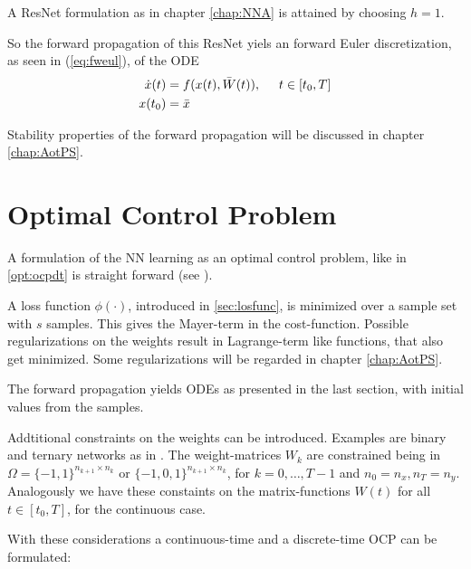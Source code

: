 \documentclass[a4paper, 12pt]{scrreprt} %
\begin{document}
A ResNet formulation as in chapter \ref{chap:NNA} is attained by choosing $h=1$.

So the forward propagation of this ResNet yiels an forward Euler discretization, as seen in (\ref{eq:fweul}), of the \ac{ODE}
\begin{align*}
\dot x(t) &= f(x(t),\bar{W}(t)) , \hspace{0.5cm}t\in [t_0,T] \\
x(t_0) &= \bar{x} 
\end{align*}

Stability properties of the forward propagation will be discussed in chapter \ref{chap:AotPS}.

\section{Optimal Control Problem}

A formulation of the \ac{NN} learning as an optimal control problem, like in \ref{opt:ocpdt} is straight forward (see \cite{aocatdl}). \newline

A loss function $\phi(\cdot)$, introduced in \ref{sec:losfunc}, is minimized over a sample set with $s$ samples. This gives the Mayer-term in the cost-function. Possible regularizations on the weights result in Lagrange-term like functions, that also get minimized. Some regularizations will be regarded in chapter \ref{chap:AotPS}. 

The forward propagation yields \acp{ODE} as presented in the last section, with initial values from the samples.

Addtitional constraints on the weights can be introduced. Examples are binary and ternary networks as in \cite{aocatdl}. The weight-matrices $W_k$ are constrained being in $\Omega = \{-1,1\}^{n_{k+1}\times n_{k}}$ or $\{-1,0,1\}^{n_{k+1}\times n_{k}}$, for $k=0,\dots,T-1$ and $n_0 = n_x, n_T = n_y$. Analogously we have these constaints on the matrix-functions $W(t)$ for all $t\in[t_0,T]$, for the continuous case. \newline

With these considerations a continuous-time and a discrete-time \ac{OCP} can be formulated:
\end{document}
